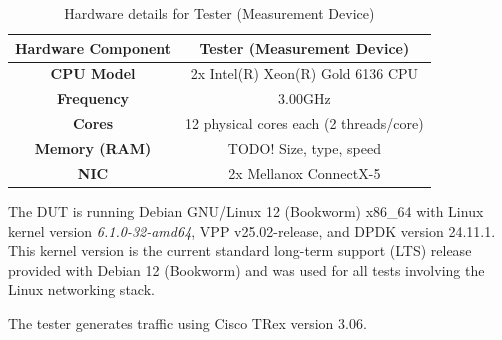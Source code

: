 \begin{table}[h!]
\centering
\caption{Hardware details for Tester (Measurement Device)}
\begin{tabular}{|c|c|}
\hline
\textbf{Hardware Component} & \textbf{Tester (Measurement Device)} \\
\hline
\textbf{CPU Model} & 2x Intel(R) Xeon(R) Gold 6136 CPU \\
\hline
\textbf{Frequency} & 3.00GHz \\
\hline
\textbf{Cores} & 12 physical cores each (2 threads/core)\\
\hline
\textbf{Memory (RAM)} & TODO! Size, type, speed \\
\hline
\textbf{NIC} & 2x Mellanox ConnectX-5 \\
\hline
\end{tabular}
\label{tab:hardware_tester}
\end{table}

The DUT is running Debian GNU/Linux 12 (Bookworm) x86\_64 with Linux kernel version \textit{6.1.0-32-amd64}, VPP v25.02-release, and DPDK version 24.11.1. 
This kernel version is the current standard long-term support (LTS) release provided with Debian 12 (Bookworm) and was used for all tests involving the Linux networking stack.

The tester generates traffic using Cisco TRex version 3.06.
